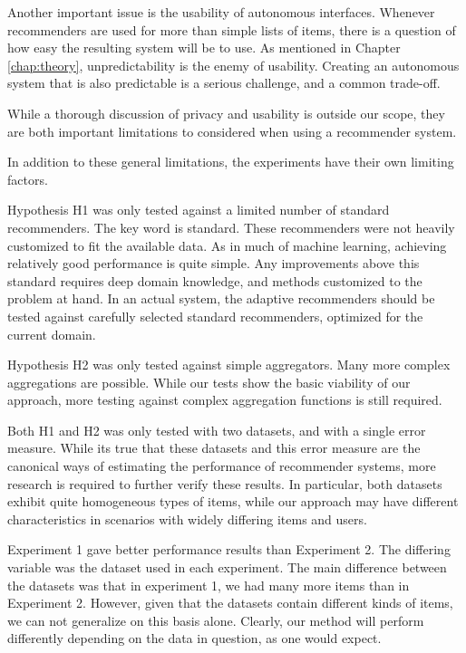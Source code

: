 Another important issue is the usability of autonomous interfaces.
Whenever recommenders are used for more than simple lists of items,
there is a question of how easy the resulting system will be to use.
As mentioned in Chapter \ref{chap:theory},
unpredictability is the enemy of usability.
Creating an autonomous system that is also
predictable is a serious challenge, and a common trade-off.

While a thorough discussion of privacy and usability is 
outside our scope, they are both important limitations to considered
when using a recommender system.

In addition to these general limitations, 
the experiments have their own limiting factors.

Hypothesis H1 was only tested against a limited number of standard recommenders.
The key word is standard. These recommenders were not heavily customized
to fit the available data. As in much of machine learning,
achieving relatively good performance is quite simple.
Any improvements above this standard requires deep domain knowledge,
and methods customized to the problem at hand.
In an actual system, the adaptive recommenders should be tested
against carefully selected standard recommenders,
optimized for the current domain.

Hypothesis H2 was only tested against simple aggregators.
Many more complex aggregations are possible.
While our tests show the basic viability of our approach,
more testing against complex aggregation functions
is still required.

Both H1 and H2 was only tested with two datasets, and with a single error measure.
While its true that these datasets and this error measure are the canonical ways
of estimating the performance of recommender systems,
more research is required to further verify these results.
In particular, both datasets exhibit quite homogeneous types of items,
while our approach may have different characteristics in scenarios
with widely differing items and users.

Experiment 1 gave better performance results than Experiment 2.
The differing variable was the dataset used in each experiment.
The main difference between the datasets was that in experiment 1,
we had many more items than in Experiment 2.
However, given that the datasets contain different kinds of items,
we can not generalize on this basis alone.
Clearly, our method will perform differently depending on the data in question,
as one would expect.

